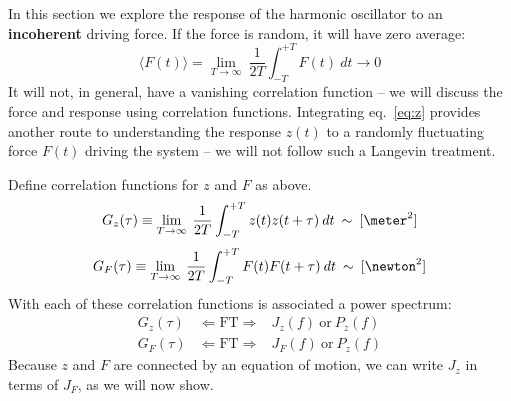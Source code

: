 \label{sect:steady-state-response-II}

In this section we explore the response of the harmonic oscillator to
an {\bf incoherent} driving force.  If the force is random, it will
have zero average:
\begin{equation}
\langle F(t) \rangle = \lim_{T \rightarrow \infty} \: \frac{1}{2 T} \int_{-T}^{+T} F(t) \: dt \longrightarrow 0
\end{equation}
It will not, in general, have a vanishing correlation function -- we
will discuss the force and response using correlation functions.
Integrating eq.~\ref{eq:z} provides another route to understanding the
response $z(t)$ to a randomly fluctuating force $F(t)$ driving the
system -- we will not follow such a Langevin treatment.

Define correlation functions for $z$ and $F$ as above.
\begin{equation}
G_z(\tau) \equiv \lim_{T \rightarrow \infty} \: \frac{1}{2 T} \int_{-T}^{+T} z(t) z(t+\tau) \: dt \: \sim \: [\meter^2]
\end{equation}
\begin{equation}
G_F(\tau) \equiv \lim_{T \rightarrow \infty} \: \frac{1}{2 T} \int_{-T}^{+T} F(t) F(t+\tau) \: dt \: \sim \: [\newton^2]
\end{equation}
With each of these correlation functions is associated a power spectrum:
\begin{eqnarray*}
G_z(\tau) & \Leftarrow \mbox{FT} \Rightarrow & J_z(f) \: \mbox{or} \: P_z(f) \\
G_F(\tau) & \Leftarrow \mbox{FT} \Rightarrow & J_F(f) \: \mbox{or} \: P_z(f)
\end{eqnarray*} 
Because $z$ and $F$ are connected by an equation of motion, we can
write $J_z$ in terms of $J_F$, as we will now show.

